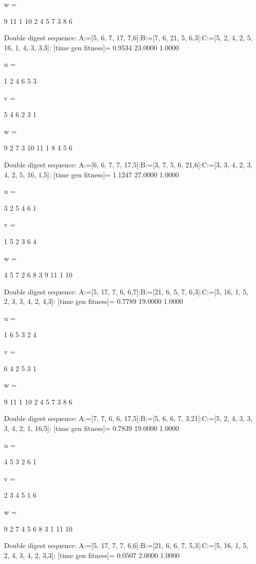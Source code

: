 w =

     9    11     1    10     2     4     5     7     3     8     6

Double digest sequence:
A:=[5, 6, 7, 17, 7,6]:B:=[7, 6, 21, 5, 6,3]:C:=[5, 2, 4, 2, 5, 16, 1, 4, 3, 3,3]:
[time gen fitness]=
    0.9534   23.0000    1.0000


u =

     1     2     4     6     5     3


v =

     5     4     6     2     3     1


w =

     9     2     7     3    10    11     1     8     4     5     6

Double digest sequence:
A:=[6, 6, 7, 7, 17,5]:B:=[3, 7, 5, 6, 21,6]:C:=[3, 3, 4, 2, 3, 4, 2, 5, 16, 1,5]:
[time gen fitness]=
    1.1247   27.0000    1.0000


u =

     3     2     5     4     6     1


v =

     1     5     2     3     6     4


w =

     4     5     7     2     6     8     3     9    11     1    10

Double digest sequence:
A:=[5, 17, 7, 6, 6,7]:B:=[21, 6, 5, 7, 6,3]:C:=[5, 16, 1, 5, 2, 3, 3, 4, 2, 4,3]:
[time gen fitness]=
    0.7789   19.0000    1.0000


u =

     1     6     5     3     2     4


v =

     6     4     2     5     3     1


w =

     9    11     1    10     2     4     5     7     3     8     6

Double digest sequence:
A:=[7, 7, 6, 6, 17,5]:B:=[5, 6, 6, 7, 3,21]:C:=[5, 2, 4, 3, 3, 3, 4, 2, 1, 16,5]:
[time gen fitness]=
    0.7839   19.0000    1.0000


u =

     4     5     3     2     6     1


v =

     2     3     4     5     1     6


w =

     9     2     7     4     5     6     8     3     1    11    10

Double digest sequence:
A:=[5, 17, 7, 7, 6,6]:B:=[21, 6, 6, 7, 5,3]:C:=[5, 16, 1, 5, 2, 4, 3, 4, 2, 3,3]:
[time gen fitness]=
    0.0507    2.0000    1.0000


